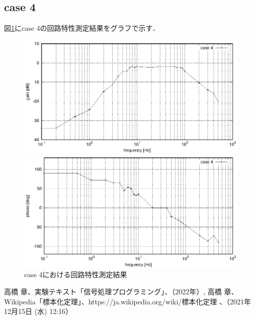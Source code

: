 \documentclass[dvipdfmx,titlepage,a4j]{jsarticle}  %
\begin{document}
\subsection{case 4}
図\ref{fig:gr:case4}にcase 4の回路特性測定結果をグラフで示す．
\begin{figure}[H]
  \centering
  \begin{minipage}{8cm}
    \centering
    \includegraphics[keepaspectratio, scale=0.6]{../data/case4-g.eps}
  \end{minipage}
  \begin{minipage}{8cm}
    \centering
    \includegraphics[keepaspectratio, scale=0.6]{../data/case4-f.eps}
  \end{minipage}
  \caption{case 4における回路特性測定結果}
  \label{fig:gr:case4}
\end{figure}


\begin{thebibliography}{99}
   高橋 章、実験テキスト「信号処理プログラミング」、（2022年）,
   高橋 章、Wikipedia「標本化定理」、{https://ja.wikipedia.org/wiki/標本化定理} 、（2021年12月15日 (水) 12:16）
\end{thebibliography}
\end{document}
